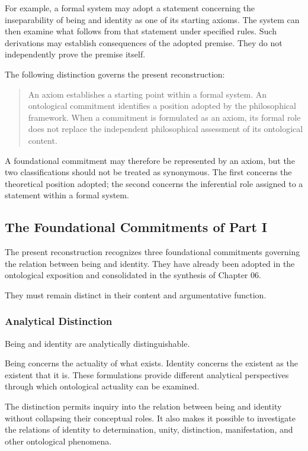 For example, a formal system may adopt a statement concerning
the inseparability of being and identity as one of its
starting axioms. The system can then examine what follows
from that statement under specified rules. Such derivations
may establish consequences of the adopted premise. They
do not independently prove the premise itself.

The following distinction governs the present reconstruction:

\begin{quote}
An axiom establishes a starting point within a formal system.
An ontological commitment identifies a position adopted by
the philosophical framework. When a commitment is formulated
as an axiom, its formal role does not replace the independent
philosophical assessment of its ontological content.
\end{quote}

A foundational commitment may therefore be represented by
an axiom, but the two classifications should not be treated
as synonymous. The first concerns the theoretical position
adopted; the second concerns the inferential role assigned
to a statement within a formal system.

\subsection{The Foundational Commitments of Part I}

The present reconstruction recognizes three foundational
commitments governing the relation between being and identity.
They have already been adopted in the ontological exposition
and consolidated in the synthesis of Chapter 06.

They must remain distinct in their content and argumentative
function.

\subsubsection{Analytical Distinction}

Being and identity are analytically distinguishable.

Being concerns the actuality of what exists. Identity concerns
the existent as the existent that it is. These formulations
provide different analytical perspectives through which
ontological actuality can be examined.

The distinction permits inquiry into the relation between
being and identity without collapsing their conceptual roles.
It also makes it possible to investigate the relations of
identity to determination, unity, distinction, manifestation,
and other ontological phenomena.

